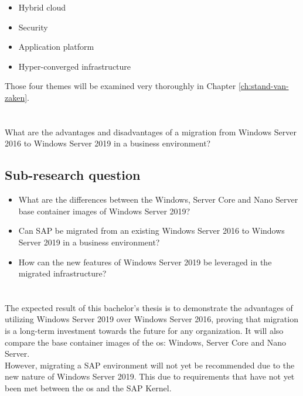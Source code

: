 \begin{itemize}
	\item Hybrid cloud
	\item Security
	\item Application platform
	\item Hyper-converged infrastructure
\end{itemize}

Those four themes will be examined very thoroughly in Chapter \ref{ch:stand-van-zaken}.

\section{}
\label{sec:onderzoeksvraag}
What are the advantages and disadvantages of a migration from Windows Server 2016 to Windows Server 2019 in a business environment?

\subsection{Sub-research question}

\begin{itemize}
	\item What are the differences between the Windows, Server Core and Nano Server base container images of Windows Server 2019?
	\item Can SAP be migrated from an existing Windows Server 2016 to Windows Server 2019 in a business environment?
	\item How can the new features of Windows Server 2019 be leveraged in the migrated infrastructure? 
\end{itemize}

\section{}
\label{sec:onderzoeksdoelstelling}

The expected result of this bachelor's thesis is to demonstrate the advantages of utilizing Windows Server 2019 over Windows Server 2016, proving that migration is a long-term investment towards the future for any organization. 
It will also compare the base container images of the \acrshort{os}: Windows, Server Core and Nano Server. \\
However, migrating a SAP environment will not yet be recommended due to the new nature of Windows Server 2019. 
This due to requirements that have not yet been met between the \acrshort{os} and the SAP Kernel. 

